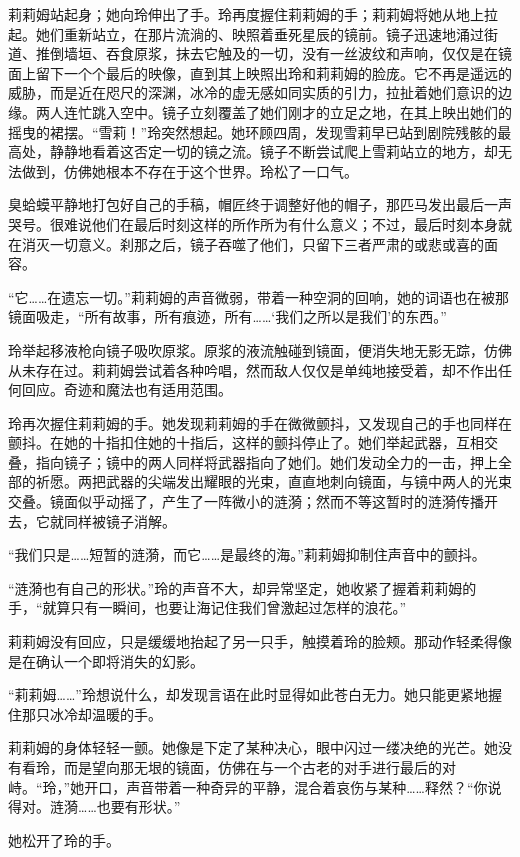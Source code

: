 莉莉姆站起身；她向玲伸出了手。玲再度握住莉莉姆的手；莉莉姆将她从地上拉起。她们重新站立，在那片流淌的、映照着垂死星辰的镜前。镜子迅速地涌过街道、推倒墙垣、吞食原浆，抹去它触及的一切，没有一丝波纹和声响，仅仅是在镜面上留下一个个最后的映像，直到其上映照出玲和莉莉姆的脸庞。它不再是遥远的威胁，而是近在咫尺的深渊，冰冷的虚无感如同实质的引力，拉扯着她们意识的边缘。两人连忙跳入空中。镜子立刻覆盖了她们刚才的立足之地，在其上映出她们的摇曳的裙摆。“雪莉！”玲突然想起。她环顾四周，发现雪莉早已站到剧院残骸的最高处，静静地看着这否定一切的镜之流。镜子不断尝试爬上雪莉站立的地方，却无法做到，仿佛她根本不存在于这个世界。玲松了一口气。

臭蛤蟆平静地打包好自己的手稿，帽匠终于调整好他的帽子，那匹马发出最后一声哭号。很难说他们在最后时刻这样的所作所为有什么意义；不过，最后时刻本身就在消灭一切意义。刹那之后，镜子吞噬了他们，只留下三者严肃的或悲或喜的面容。

“它……在遗忘一切。”莉莉姆的声音微弱，带着一种空洞的回响，她的词语也在被那镜面吸走，“所有故事，所有痕迹，所有……‘我们之所以是我们’的东西。”

玲举起移液枪向镜子吸吹原浆。原浆的液流触碰到镜面，便消失地无影无踪，仿佛从未存在过。莉莉姆尝试着各种吟唱，然而敌人仅仅是单纯地接受着，却不作出任何回应。奇迹和魔法也有适用范围。

玲再次握住莉莉姆的手。她发现莉莉姆的手在微微颤抖，又发现自己的手也同样在颤抖。在她的十指扣住她的十指后，这样的颤抖停止了。她们举起武器，互相交叠，指向镜子；镜中的两人同样将武器指向了她们。她们发动全力的一击，押上全部的祈愿。两把武器的尖端发出耀眼的光束，直直地刺向镜面，与镜中两人的光束交叠。镜面似乎动摇了，产生了一阵微小的涟漪；然而不等这暂时的涟漪传播开去，它就同样被镜子消解。

“我们只是……短暂的涟漪，而它……是最终的海。”莉莉姆抑制住声音中的颤抖。

“涟漪也有自己的形状。”玲的声音不大，却异常坚定，她收紧了握着莉莉姆的手，“就算只有一瞬间，也要让海记住我们曾激起过怎样的浪花。”

莉莉姆没有回应，只是缓缓地抬起了另一只手，触摸着玲的脸颊。那动作轻柔得像是在确认一个即将消失的幻影。

“莉莉姆……”玲想说什么，却发现言语在此时显得如此苍白无力。她只能更紧地握住那只冰冷却温暖的手。

莉莉姆的身体轻轻一颤。她像是下定了某种决心，眼中闪过一缕决绝的光芒。她没有看玲，而是望向那无垠的镜面，仿佛在与一个古老的对手进行最后的对峙。“玲，”她开口，声音带着一种奇异的平静，混合着哀伤与某种……释然？“你说得对。涟漪……也要有形状。”

她松开了玲的手。

